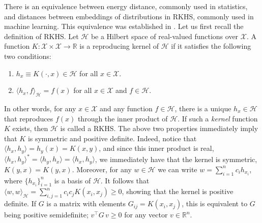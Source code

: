 \documentclass[aps,preprint,nofootinbib,floatfix]{revtex4-1}
\newcommand\kk{K}
\newcommand\kkk{h}
\newcommand\HH{\mathcal{H}}
\begin{document}
There is an equivalence between energy distance, 
commonly used in statistics,
and distances between embeddings of distributions in 
RKHS, commonly used in machine learning. 
This equivalence was established
in \cite{Sejdinovic2013}. Let us first recall the definition of
RKHS. Let $\HH$ be a Hilbert space of real-valued functions
over $\mathcal{X}$. A function 
$\kk : \mathcal{X} \times \mathcal{X} \to 
\mathbb{R}$ is a reproducing kernel of $\HH$ if it satisfies
the following two conditions:
\begin{enumerate}
\item $\kkk_x \equiv \kk(\cdot, x) \in \HH$ 
for all $x \in \mathcal{X}$.
\item $\langle \kkk_x, f \rangle_{\HH} = f(x)$ for
all $x\in\mathcal{X}$ and $f\in \HH$.
\end{enumerate}
In other words, for any $x \in \mathcal{X}$ and any function $f \in \HH$,
there is a unique 
$\kkk_x \in \HH$ that reproduces $f(x)$ through the inner product
of $\HH$.
If such a \emph{kernel} 
function $\kk$ exists, then $\HH$ is called a RKHS. The above two 
properties immediately imply that $\kk$ is symmetric and positive
definite. Indeed, notice that
$\langle \kkk_x, \kkk_y \rangle = \kkk_y(x) = \kk(x,y)$, and since
this inner product is real,
$\langle \kkk_x, \kkk_y \rangle^* = \langle \kkk_y, \kkk_x \rangle = 
\langle \kkk_x, \kkk_y \rangle$, we immediately have that
the kernel is symmetric,
$\kk(y,x) = \kk(y,x)$. Moreover, for any $w \in
\HH$ we can write $w = \sum_{i=1}^n c_i \kkk_{x_i}$, where
$\{ \kkk_{x_i} \}_{i=1}^n$ is a basis of $\HH$. It follows that
$\langle w, w \rangle_{\HH}  = \sum_{i,j=1}^n c_i c_j \kk(x_i,x_j) \ge 0$,
showing that the kernel is positive definite. If $G$ is a matrix with
elements $G_{ij} = \kk(x_i,x_j)$, this is equivalent to $G$ being
positive semidefinite; $v^\top G \, v \ge 0$ for any vector
$v \in \mathbb{R}^n$.
\end{document}

